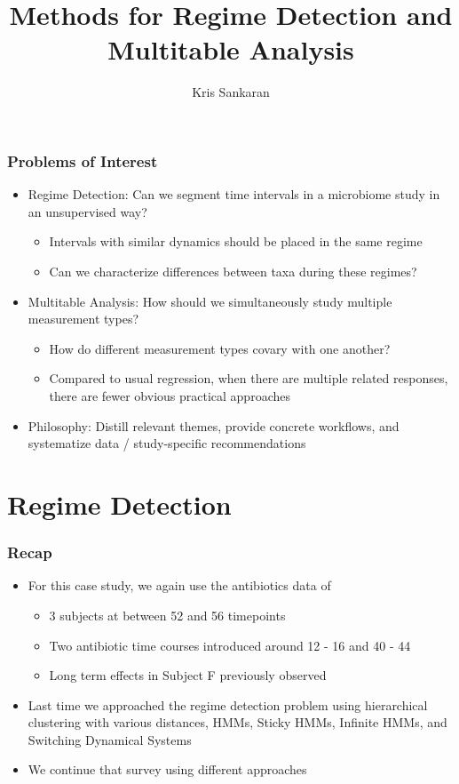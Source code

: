 \documentclass{beamer}
\title{Methods for Regime Detection and Multitable Analysis}
\author{Kris Sankaran}
\begin{document}
\maketitle

\begin{frame}
  \frametitle{Problems of Interest}
 \begin{itemize}
 \item Regime Detection: Can we segment time intervals in a microbiome study in
   an unsupervised way?
   \begin{itemize}
   \item Intervals with similar dynamics should be placed in the same regime
   \item Can we characterize differences between taxa during these regimes?
   \end{itemize}
 \item Multitable Analysis: How should we simultaneously study multiple
   measurement types?
   \begin{itemize}
   \item How do different measurement types covary with one another?
   \item Compared to usual regression, when there are multiple related
     responses, there are fewer obvious practical approaches
   \end{itemize}
 \item Philosophy: Distill relevant themes, provide concrete workflows, and
   systematize data / study-specific recommendations
 \end{itemize}
\end{frame}

\section{Regime Detection}
\label{sec:regime_detection}

\begin{frame}
  \frametitle{Recap}
 \begin{itemize}
 \item For this case study, we again use the antibiotics data of
   \citep{dethlefsen2008pervasive}
   \begin{itemize}
   \item 3 subjects at between 52 and 56 timepoints
   \item Two antibiotic time courses introduced around 12 - 16 and 40 - 44
   \item Long term effects in Subject F previously observed
   \end{itemize}
 \item Last time we approached the regime detection problem using hierarchical
   clustering with various distances, HMMs, Sticky HMMs, Infinite HMMs, and
   Switching Dynamical Systems
 \item We continue that survey using different approaches
 \end{itemize}
\end{frame}
\end{document}
